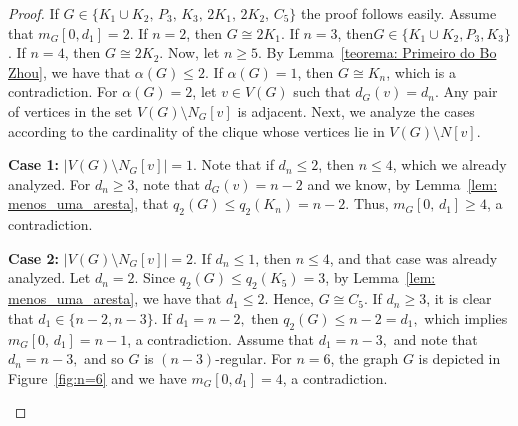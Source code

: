 \documentclass[preprint,12pt]{elsarticle}
\begin{document}
\begin{proof}

If $G \in \{K_1 \cup K_2,\, P_3,\, K_3,\, 2K_1,\, 2K_2,\, C_5\}$ the proof follows easily. Assume that $m_G[0, d_1] = 2$. If $n = 2$, then $G \cong 2K_1$. If $n = 3$, then\linebreak $G \in \{K_1 \cup K_2, P_3, K_3\}$. If $n = 4$, then $G \cong 2K_2$. Now, let $n \geq 5$. By Lemma~\ref{teorema: Primeiro do Bo Zhou}, we have that $\alpha(G) \leq 2$. If $\alpha(G) = 1$, then $G \cong K_n$, which is a contradiction. For $\alpha(G) = 2$, let \( v \in V(G) \) such that \( d_G(v) = d_n \). Any pair of vertices in the set \( V(G) \setminus N_G[v] \) is adjacent. Next, we analyze the cases according to the cardinality of the clique whose vertices lie in $V(G)\setminus N[v]$.

 \noindent\textbf{Case 1:} \( |V(G) \setminus N_G[v]| = 1 \). 
Note that if \(d_n \leq 2\), then \(n \leq 4\), which we already analyzed. For \(d_n \geq 3\), note that $d_G(v) = n - 2$ and we know, by Lemma~\ref{lem: menos_uma_aresta}, that $q_2(G) \leq q_2(K_n) = n - 2$. Thus, $m_G[0,\,d_1] \geq 4$, a contradiction.


 \noindent\textbf{Case 2:} \( |V(G) \setminus N_G[v]| = 2 \). 
If \(d_n \leq 1\), then \(n \leq 4\), and that case was already analyzed. Let $d_n = 2$. Since $q_2(G) \leq q_2(K_5) = 3$, by Lemma~\ref{lem: menos_uma_aresta}, we have that $d_1 \leq 2$. Hence, $G \cong C_5$. If $d_n \geq 3$, it is clear that $d_1 \in \{n-2, n-3\}.$ If $d_1 = n-2,$ then $q_2(G) \leq n-2 = d_1,$ which implies $m_{G}[0,\,d_1] = n-1$, a contradiction. Assume that $d_{1} = n-3,$ and note that $d_{n}=n-3,$ and so $G$ is $(n-3)$-regular. 
For \( n = 6 \), the graph \( G \) is depicted in Figure~\ref{fig:n=6} and we have \( m_G[0, d_1] = 4 \), a contradiction. 
\begin{figure}[h]
 \centering
 \vspace{1em}
\end{figure}
\end{proof}
\end{document}
